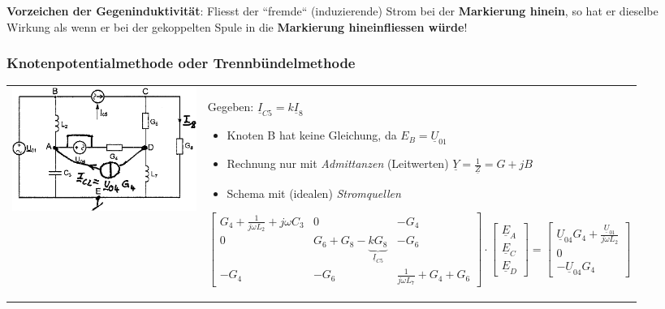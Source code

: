\textbf{Vorzeichen der Gegeninduktivität}: 
Fliesst der ``fremde`` (induzierende) Strom bei der \textbf{Markierung hinein}, so hat er dieselbe
Wirkung als wenn er bei der gekoppelten Spule in die \textbf{Markierung
hineinfliessen würde}! 


\subsubsection{Knotenpotentialmethode oder Trennbündelmethode}
\begin{tabular}{ll}
\parbox{6cm}{\includegraphics[width=6cm]{./bilder/netzwerkanalyse-knotenpotential.png}
	}
	& \parbox{12cm}{
	Gegeben: $\underline{I}_{C5} = k \underline{I}_8$
	\begin{itemize}
      \item Knoten B hat keine Gleichung, da $E_B = \underline{U}_{01}$
      \item Rechnung nur mit \textit{Admittanzen} (Leitwerten) $\underline{Y}
      = \frac{1}{\underline{Z}} = G + jB$
      \item Schema mit (idealen) \textit{Stromquellen}
    \end{itemize}
$$\begin{bmatrix}
    G_4 + \frac{1}{j \omega L_2} + j \omega C_3 & 0 & -G_4 \\
    0 & G_6 + G_8 - \underbrace{k G_8}_{\underline{I}_{C5}} & -G_6 \\
    -G_4 & -G_6 & \frac{1}{j \omega L_7} + G_4 + G_6   
	\end{bmatrix} \cdot
\begin{bmatrix}
    \underline{E}_A \\ \underline{E}_C \\ \underline{E}_D
    \end{bmatrix} =
\begin{bmatrix}
    \underline{U}_{04} G_4 + \frac{\underline{U}_{01} }{j \omega L_2}\\ 
    0 \\
    -\underline{U}_{04} G_4 \end{bmatrix}$$    
	}
\end{tabular}

